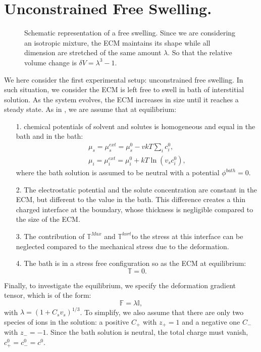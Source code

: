\documentclass[runningheads]{llncs}
\newcommand{\F}{\ensuremath{\mathbb{F}}}
\begin{document}
\section{Unconstrained Free Swelling.}

\begin{figure}
	\centering
	\def\svgwidth{0.95\linewidth}
	
	\caption{Schematic representation of a free swelling. Since we are considering an isotropic mixture, the ECM maintains its shape while all dimension are stretched of the same amount $\lambda$. So that the relative volume change is $\delta V = \lambda^3-1$. }
\end{figure}

We here consider the first experimental setup: unconstrained free swelling. In such situation, we consider the ECM is left free to swell in bath of interstitial solution. As the system evolves, the ECM increases in size until it reaches a steady state. As in \cite{DROZDOVph}, we are assume that at equilibrium:
\begin{itemize}
	\item[1.] chemical potentials of solvent and solutes is homogeneous and equal in the bath and in the bath:
	\begin{eqnarray}
	\mu_s=\mu^{ext}_s = \mu^0_s - vkT \sum_i c^0_i ,\\\label{free1}
	\mu_i=\mu^{ext}_i = \mu^0_i +kT\ln(v_sc^0_i),
	\end{eqnarray} 
	where the bath solution is assumed to be neutral with a potential $\phi^{bath}=0$.
	\item[2.] The electrostatic potential and the solute concentration are constant in the ECM, but different to the value in the bath. This difference creates a thin charged interface at the boundary, whose thickness is negligible compared to the size of the ECM.
	\item[3.] The contribution of $\mathbb{T}^{Max}$ and $\mathbb{T}^{kort}$to the stress at this interface can be neglected compared to the mechanical stress due to the deformation. 
	\item[4.] The bath is in a stress free configuration so as the ECM at equilibrium:
	\begin{equation}
	\mathbb{T}=0.\label{free2}
	\end{equation} 
\end{itemize}

Finally, to investigate the equilibrium, we specify the deformation gradient tensor, which is of the form:
\begin{equation}
\F= \lambda \mathbb{I},\label{deffree}                                                                
\end{equation}
with $\lambda=(1+C_s v_s)^{1/3}$. To simplify, we also assume that there are only two species of ions in the solution: a positive $C_+$ with $z_+=1$ and a negative one $C_-$ with $z_-=-1$. Since the bath solution is neutral, the total charge must vanish, $c^0_+=c^0_-=c^0$.
\end{document}
